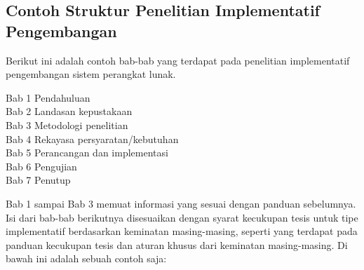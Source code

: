 \subsection{Contoh Struktur Penelitian Implementatif Pengembangan}

Berikut ini adalah contoh bab-bab yang terdapat pada penelitian implementatif pengembangan sistem perangkat lunak. 
\begin{displayquote}
  Bab 1 Pendahuluan \\
  Bab 2 Landasan kepustakaan \\
  Bab 3 Metodologi penelitian \\
  Bab 4 Rekayasa persyaratan/kebutuhan \\ 
  Bab 5 Perancangan dan implementasi \\
  Bab 6 Pengujian \\
  Bab 7 Penutup \\
\end{displayquote}

Bab 1 sampai Bab 3 memuat informasi yang sesuai dengan panduan sebelumnya. Isi dari bab-bab berikutnya disesuaikan dengan syarat kecukupan tesis untuk tipe implementatif berdasarkan keminatan masing-masing, seperti yang terdapat pada panduan kecukupan tesis dan aturan khusus dari keminatan masing-masing. Di bawah ini adalah sebuah contoh saja: 


